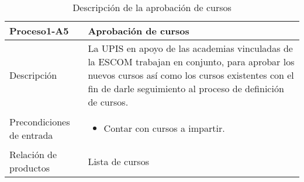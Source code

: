 \begin{table}[H]
	\centering
	\begin{tabular}{p{5cm} p{11cm}}
		\hline
		\rowcolor{LightBlue2} \textbf{Proceso1-A5} & \textbf{Aprobación de cursos}\\
		\hline\hline
		Descripción & La UPIS en apoyo de las academias vinculadas de la ESCOM trabajan en conjunto, para aprobar los nuevos cursos así como los cursos existentes con el fin de darle seguimiento al proceso de definición de cursos.\\
		\hline
		Precondiciones de entrada & 
		\begin{itemize}
			\item Contar con cursos a impartir.
		\end{itemize}
		\\					
		\hline
		Relación de productos & Lista de cursos\\
		\hline
	\end{tabular}
	\caption{Descripción de la aprobación de cursos}
\end{table}
